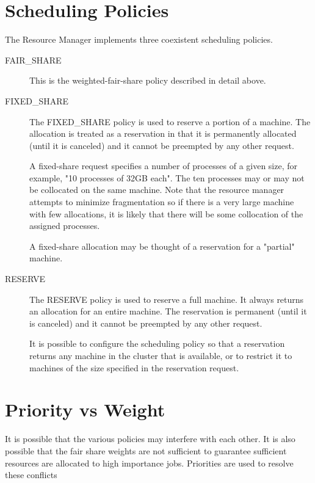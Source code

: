     \section{Scheduling Policies}

    The Resource Manager implements three coexistent scheduling policies. 
    \begin{description}
        \item[FAIR\_SHARE] This is the weighted-fair-share policy described in detail above.

        \item[FIXED\_SHARE] The FIXED\_SHARE policy is used to reserve a portion of a machine. The
          allocation is treated as a reservation in that it is permanently allocated (until it is
          canceled) and it cannot be preempted by any other request.

          A fixed-share request specifies a number of processes of a given size, for example, "10 
          processes of 32GB each". The ten processes may or may not be collocated on the same 
          machine. Note that the resource manager attempts to minimize fragmentation so if there is a 
          very large machine with few allocations, it is likely that there will be some collocation of the 
          assigned processes. 
          
          A fixed-share allocation may be thought of a reservation for a "partial" machine. 

        \item[RESERVE] The RESERVE policy is used to reserve a full machine. It always returns an
          allocation for an entire machine. The reservation is permanent (until it is canceled) and
          it cannot be preempted by any other request.

          It is possible to configure the scheduling policy so that a reservation returns any machine in 
          the cluster that is available, or to restrict it to machines of the size specified in the reservation 
          request. 
    \end{description}
    
    \section{Priority vs Weight}

    It is possible that the various policies may interfere with each other. It is also possible that
    the fair share weights are not sufficient to guarantee sufficient resources are allocated to
    high importance jobs. Priorities are used to resolve these conflicts


